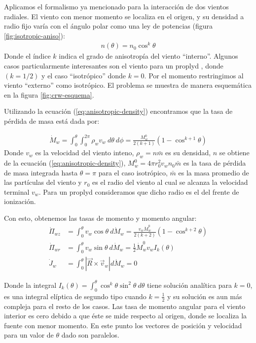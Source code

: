 Aplicamos el formalismo ya mencionado para la interacción de dos vientos radiales. El viento con menor momento
se localiza en el origen, y su densidad a radio fijo varía con el ángulo polar como una ley de potencias
(figura \ref{fig:isotropic-aniso}):
\begin{align}
  n(\theta) = n_0\cos^k\theta \label{eq:anisotropic-density}
\end{align}
Donde el índice $k$ indica el grado de anisotropía del viento ``interno''. Algunos casos particularmente interesantes
son el viento para un proplyd \citep{HA:1998}, donde $(k=1/2)$ y el caso ``isotrópico'' \citep{Canto:1996} donde $k=0$.
Por el momento restringimos al viento ``externo'' como isotrópico. El problema se muestra de manera esquemática en la
figura \ref{fig:crw-esquema}.

Utilizando la ecuación (\ref{eq:anisotropic-density}) encontramos que la tasa de pérdida de masa está dada por:

\begin{align}
  \dot{M}_w = \int^\theta_0\int^{2\pi}_0\rho_w v_w~d\theta~d\phi =
  \frac{M^0_w}{2\left(k+1\right)}\left(1 - \cos^{k+1}\theta\right)
\end{align}
Donde $v_w$ es la velocidad del viento inteno, $\rho_w = n\bar{m}$  es su densidad, $n$ se obtiene de la ecuación
(\ref{eq:anisotropic-density}), $M^0_w = 4\pi r^2_0v_w n_0 \bar{m}$ es la tasa de pérdida de masa integrada hasta
$\theta = \pi$ para el caso isotrópico, $\bar{m}$  es la masa promedio de las partículas del viento y
$r_0$ es el radio del viento al cual se alcanza la velocidad terminal $v_w$. Para un proplyd consideramos que dicho
radio es el del frente de ionización.

Con esto, obtenemos las tasas de momento y momento angular:
\begin{align}
  \dot{\Pi}_{wz} &= \int^\theta_0 v_w\cos\theta~d\dot{M}_w =
                   \frac{v_w \dot{M}^0_w}{2\left(k+2\right)}\left(1 - \cos^{k+2}\theta\right) \label{eq:Pi-wz} \\
  \dot{\Pi}_{wr} &= \int^\theta_0 v_w\sin\theta~d\dot{M}_w = \frac{1}{2}\dot{M}^0_w v_w I_k(\theta) \\
  \dot{J}_w &= \int^\theta_0 |\vec{R} \times \vec{v}_w|d\dot{M}_w = 0
\end{align}

Donde la integral $I_k(\theta) = \int^\theta_0 \cos^k\theta \sin^2\theta~d\theta$ tiene solución analítica para $k=0$,
es una integral elíptica de segundo tipo cuando $k=\frac{1}{2}$ y su solución es aun más compleja para el resto de los
casos. Las tasa de momento angular para el viento interior es cero debido a que éste se mide respecto al origen, donde
se localiza la fuente con menor momento. En este punto los vectores de posición y velocidad para un valor de $\theta$
dado son paralelos.

